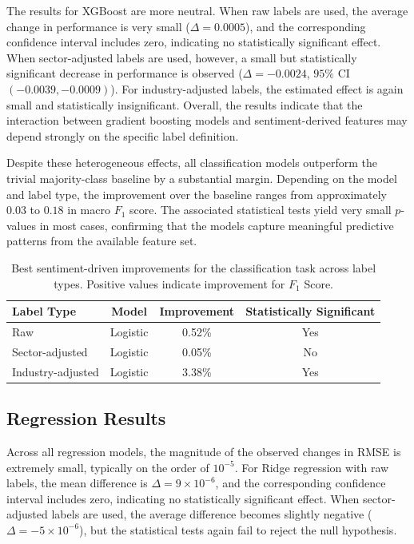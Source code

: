 The results for XGBoost are more neutral. When raw labels are used, the average change in performance is very small ($\Delta = 0.0005$), and the corresponding confidence interval includes zero, indicating no statistically significant effect. When sector-adjusted labels are used, however, a small but statistically significant decrease in performance is observed ($\Delta = -0.0024$, $95\%$ CI $(-0.0039, -0.0009)$). For industry-adjusted labels, the estimated effect is again small and statistically insignificant. Overall, the results indicate that the interaction between gradient boosting models and sentiment-derived features may depend strongly on the specific label definition.

Despite these heterogeneous effects, all classification models outperform the trivial majority-class baseline by a substantial margin. Depending on the model and label type, the improvement over the baseline ranges from approximately $0.03$ to $0.18$ in macro $F_1$ score. The associated statistical tests yield very small $p$-values in most cases, confirming that the models capture meaningful predictive patterns from the available feature set.

\begin{table}
\centering
\caption{Best sentiment-driven improvements for the classification task across label types. Positive values indicate improvement for $F_1$ Score.}
\label{tab:classification_best_models}
\begin{tabular}{lccc}
\hline
\textbf{Label Type} & \textbf{Model} & \textbf{Improvement} & \textbf{Statistically Significant} \\
\hline
Raw & Logistic & 0.52\% & Yes \\
Sector-adjusted & Logistic & 0.05\% & No \\
Industry-adjusted & Logistic & 3.38\% & Yes \\
\hline
\end{tabular}
\end{table}

\subsection{Regression Results}

Across all regression models, the magnitude of the observed changes in RMSE is extremely small, typically on the order of $10^{-5}$. For Ridge regression with raw labels, the mean difference is $\Delta = 9 \times 10^{-6}$, and the corresponding confidence interval includes zero, indicating no statistically significant effect. When sector-adjusted labels are used, the average difference becomes slightly negative ($\Delta = -5 \times 10^{-6}$), but the statistical tests again fail to reject the null hypothesis.

